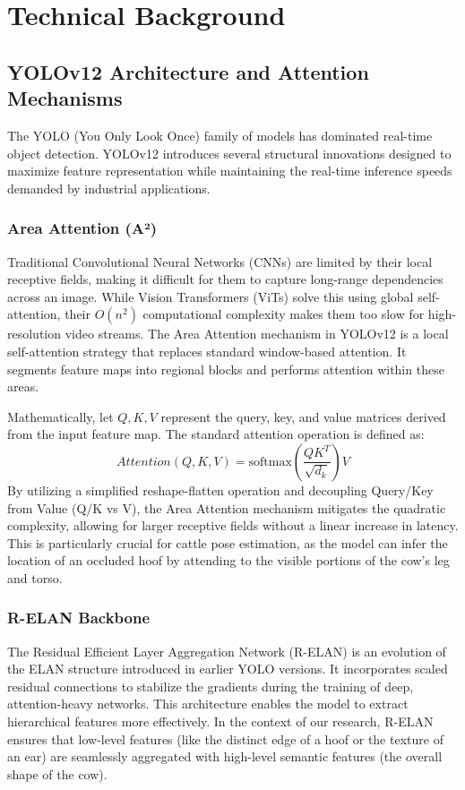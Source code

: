 \documentclass[conference]{IEEEtran}
\begin{document}
\section{Technical Background}

\subsection{YOLOv12 Architecture and Attention Mechanisms}
The YOLO (You Only Look Once) family of models has dominated real-time object detection. YOLOv12 introduces several structural innovations designed to maximize feature representation while maintaining the real-time inference speeds demanded by industrial applications.

\subsubsection{Area Attention (A²)}
Traditional Convolutional Neural Networks (CNNs) are limited by their local receptive fields, making it difficult for them to capture long-range dependencies across an image. While Vision Transformers (ViTs) solve this using global self-attention, their $O(n^2)$ computational complexity makes them too slow for high-resolution video streams. The Area Attention mechanism in YOLOv12 is a local self-attention strategy that replaces standard window-based attention. It segments feature maps into regional blocks and performs attention within these areas. 

Mathematically, let $Q, K, V$ represent the query, key, and value matrices derived from the input feature map. The standard attention operation is defined as:
\begin{equation}
    Attention(Q, K, V) = \text{softmax}\left(\frac{QK^T}{\sqrt{d_k}}\right)V
\end{equation}
By utilizing a simplified reshape-flatten operation and decoupling Query/Key from Value (Q/K vs V), the Area Attention mechanism mitigates the quadratic complexity, allowing for larger receptive fields without a linear increase in latency. This is particularly crucial for cattle pose estimation, as the model can infer the location of an occluded hoof by attending to the visible portions of the cow's leg and torso.

\subsubsection{R-ELAN Backbone}
The Residual Efficient Layer Aggregation Network (R-ELAN) is an evolution of the ELAN structure introduced in earlier YOLO versions. It incorporates scaled residual connections to stabilize the gradients during the training of deep, attention-heavy networks. This architecture enables the model to extract hierarchical features more effectively. In the context of our research, R-ELAN ensures that low-level features (like the distinct edge of a hoof or the texture of an ear) are seamlessly aggregated with high-level semantic features (the overall shape of the cow).
\end{document}
